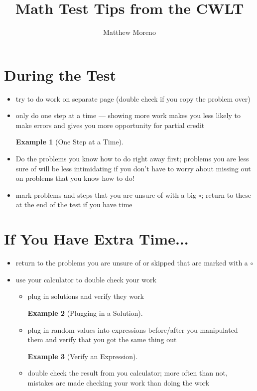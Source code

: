 \documentclass[a4paper]{article}
\title{Math Test Tips from the CWLT}
\author{Matthew Moreno}
\theoremstyle{example}
\newtheorem{example}{Example}
\begin{document}
\maketitle

\section{During the Test}

\begin{itemize}
	\item try to do work on separate page (double check if you copy the problem over)
    \item only do one step at a time --- showing more work makes you less likely to make errors and gives you more opportunity for partial credit
    \begin{example}[One Step at a Time]
    \end{example}
    \item Do the problems you know how to do right away first; problems you are less sure of will be less intimidating if you don't have to worry about missing out on problems that you know how to do!
    \item mark problems and steps that you are unsure of with a big $\circ$; return to these at the end of the test if you have time

\end{itemize}
\section{If You Have Extra Time...}
\begin{itemize}
    \item return to the problems you are unsure of or skipped that are marked with a  $\circ$
    \item use your calculator to double check your work
   	\begin{itemize}
    	\item plug in solutions and verify they work
            \begin{example}[Plugging in a Solution]
   			\end{example}
        \item plug in random values into expressions before/after you manipulated them and verify that you got the same thing out
    	\begin{example}[Verify an Expression]
   			\end{example}
		\item double check the result from you calculator; more often than not, mistakes are made checking your work than doing the work
	\end{itemize}

\end{itemize}
\end{document}
